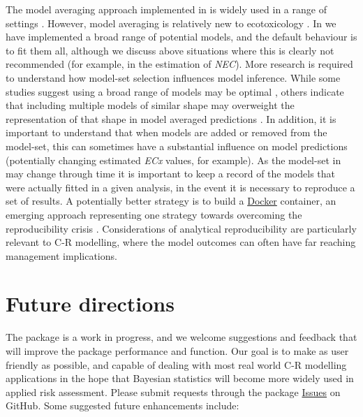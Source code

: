 \documentclass[
]{jss}
\begin{document}
The model averaging approach implemented in  is widely
used in a range of settings \citep[in ecology for example, see][ for a
thorough review]{Dormann2018}. However, model averaging is relatively
new to ecotoxicology \citep[but see, for
example,][]{Shao2014, Thorley2018, fox2020, Wheeler2009}. In
 we have implemented a broad range of potential models,
and the default behaviour is to fit them all, although we discuss above
situations where this is clearly not recommended (for example, in the
estimation of \emph{NEC}). More research is required to understand how
model-set selection influences model inference. While some studies
suggest using a broad range of models may be optimal
\citep{Wheeler2009}, others indicate that including multiple models of
similar shape may overweight the representation of that shape in model
averaged predictions \citep{fox2020}. In addition, it is important to
understand that when models are added or removed from the model-set,
this can sometimes have a substantial influence on model predictions
(potentially changing estimated \emph{ECx} values, for example). As the
model-set in  may change through time it is important to
keep a record of the models that were actually fitted in a given
analysis, in the event it is necessary to reproduce a set of results. A
potentially better strategy is to build a
\href{https://docs.docker.com/get-docker/}{Docker} container, an
emerging approach representing one strategy towards overcoming the
reproducibility crisis \citep{Baker2016}. Considerations of analytical
reproducibility are particularly relevant to C-R modelling, where the
model outcomes can often have far reaching management implications.

\hypertarget{future-directions}{%
\section{Future directions}\label{future-directions}}

The  package is a work in progress, and we welcome
suggestions and feedback that will improve the package performance and
function. Our goal is to make  as user friendly as
possible, and capable of dealing with most real world C-R modelling
applications in the hope that Bayesian statistics will become more
widely used in applied risk assessment. Please submit requests through
the package \href{https://github.com/open-AIMS/bayesnec/issues}{Issues}
on GitHub. Some suggested future enhancements include:
\end{document}
